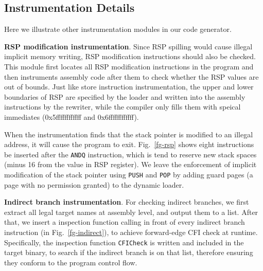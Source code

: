 \appendix



\subsection{Instrumentation Details}\label{appendix-instrumentation}

Here we illustrate other instrumentation modules in our code generator.

\vspace{3pt}\noindent\textbf{RSP modification instrumentation}. Since RSP spilling would cause illegal implicit memory writing, RSP modification instructions should also be checked. This module first locates all RSP modification instructions in the program and then instruments assembly code after them to check whether the RSP values are out of bounds. Just like store instruction instrumentation, the upper and lower boundaries of RSP are specified by the loader and written into the assembly instructions by the rewriter, while the compiler only fills them with speical immediates (0x5ffffffffffff and 0x6ffffffffffff).

When the instrumentation finds that the stack pointer is modified to an illegal address, it will cause the program to exit. Fig.~\ref{fg-rsp} shows eight instructions be inserted after the \texttt{ANDQ} instruction, which is tend to reserve new stack spaces (minus 16 from the value in RSP register). We leave the enforcement of implicit modification of the stack pointer using \texttt{PUSH} and \texttt{POP} by adding guard pages (a page with no permission granted) to the dynamic loader.



\vspace{3pt}\noindent\textbf{Indirect branch instrumentation}. For checking indirect branches, we first extract all legal target names at assembly level, and output them to a list. 
After that, we insert a inspection function calling in front of every indirect branch instruction (in Fig.~\ref{fg-indirect}), to achieve forward-edge CFI check at runtime. 
Specifically, the inspection function \verb|CFICheck| is written and included in the target binary, to search if the indirect branch is on that list, therefore ensuring they conform to the program control flow. 

